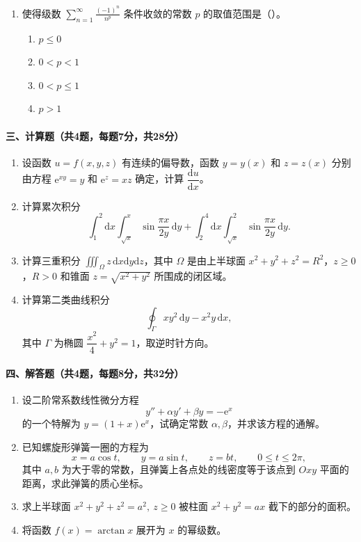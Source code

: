 \begin{enumerate}
  \item 使得级数 \(\displaystyle \sum_{n=1}^{\infty}\frac{(-1)^n}{n^p}\) 条件收敛的常数 \(p\) 的取值范围是（\quad）。
  \begin{enumerate}
    \item[A.] \(p\le 0\)
    \item[B.] \(0<p<1\)
    \item[C.] \(0<p\le 1\)
    \item[D.] \(p>1\)
  \end{enumerate}
\end{enumerate}

\paragraph*{三、计算题（共4题，每题7分，共28分）}
\begin{enumerate}
  \item 设函数 \(u=f(x,y,z)\) 有连续的偏导数，函数 \(y=y(x)\) 和 \(z=z(x)\) 分别由方程
  \(\mathrm{e}^{xy}=y\) 和 \(\mathrm{e}^z=xz\) 确定，计算 \(\dfrac{\mathrm{d}u}{\mathrm{d}x}\)。

  \item 计算累次积分
  \[
    \int_1^2\mathrm{d}x\int_{\sqrt{x}}^x\sin\frac{\pi x}{2y}\,\mathrm{d}y
    +\int_2^4\mathrm{d}x\int_{\sqrt{x}}^2\sin\frac{\pi x}{2y}\,\mathrm{d}y.
  \]

  \item 计算三重积分 \(\displaystyle \iiint_\Omega z\,\mathrm{d}x\mathrm{d}y\mathrm{d}z\)，其中 \(\Omega\) 是由上半球面
  \(x^2+y^2+z^2=R^2\)，\(z\ge 0\)，\(R>0\) 和锥面 \(z=\sqrt{x^2+y^2}\) 所围成的闭区域。

  \item 计算第二类曲线积分
  \[
    \oint_\Gamma xy^2\,\mathrm{d}y-x^2y\,\mathrm{d}x,
  \]
  其中 \(\Gamma\) 为椭圆 \(\dfrac{x^2}{4}+y^2=1\)，取逆时针方向。
\end{enumerate}

\paragraph*{四、解答题（共4题，每题8分，共32分）}
\begin{enumerate}
  \item 设二阶常系数线性微分方程
  \[
    y''+\alpha y'+\beta y=-\mathrm{e}^x
  \]
  的一个特解为 \(y=(1+x)\mathrm{e}^x\)，试确定常数 \(\alpha,\beta\)，并求该方程的通解。

  \item 已知螺旋形弹簧一圈的方程为
  \[
    x=a\cos t,\qquad y=a\sin t,\qquad z=bt,\qquad 0\le t\le 2\pi,
  \]
  其中 \(a,b\) 为大于零的常数，且弹簧上各点处的线密度等于该点到 \(Oxy\) 平面的距离，求此弹簧的质心坐标。

  \item 求上半球面 \(x^2+y^2+z^2=a^2,\ z\ge 0\) 被柱面 \(x^2+y^2=ax\) 截下的部分的面积。

  \item 将函数 \(f(x)=\arctan x\) 展开为 \(x\) 的幂级数。
\end{enumerate}

